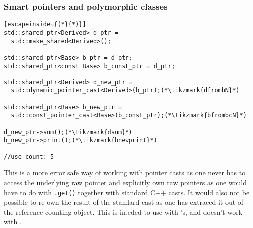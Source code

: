 \documentclass[11pt,a4paper,dvipsnames,usenames]{beamer}
\newcommand{\tikzmark}[1]{\tikz[overlay,remember picture] \node (#1) {};}
\newcommand{\std}[1]{{\ttfamily {\color{RoyalBlue} std::}{\color{OliveGreen}#1}}}
\newcommand{\uniqueptr}{\std{unique\_ptr}}
\newcommand{\sharedptr}{\std{shared\_ptr}}
\begin{document}
\begin{frame}[fragile]
  \frametitle{Smart pointers and polymorphic classes}

  \begin{lstlisting}[escapeinside={(*}{*)}]
std::shared_ptr<Derived> d_ptr = 
  std::make_shared<Derived>();

std::shared_ptr<Base> b_ptr = d_ptr;
std::shared_ptr<const Base> b_const_ptr = d_ptr;

std::shared_ptr<Derived> d_new_ptr = 
  std::dynamic_pointer_cast<Derived>(b_ptr);(*\tikzmark{dfrombN}*)

std::shared_ptr<Base> b_new_ptr = 
  std::const_pointer_cast<Base>(b_const_ptr);(*\tikzmark{bfrombcN}*)

d_new_ptr->sum();(*\tikzmark{dsum}*)
b_new_ptr->print();(*\tikzmark{bnewprint}*)

//use_count: 5
  \end{lstlisting}


  \note
  {
    This is a more error safe way of working with pointer casts as one never has to access
    the underlying raw pointer and explicitly own raw pointers as one would have to do
    with \lstinline!.get()! together with standard C++ casts. It would also not be possible to
    re-own the result of the standard cast as one has extraced it out of the reference counting
    object. This is inteded to use with \sharedptr{}'s, and doesn't work with \uniqueptr{}.
  }

\end{frame}
\end{document}
